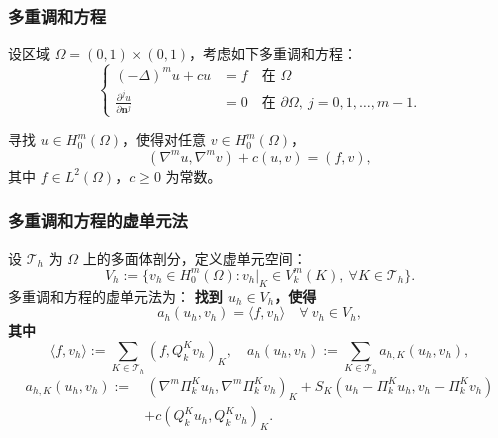 \documentclass[notheorems,serif]{beamer}
\begin{document}
\begin{frame}
\frametitle{多重调和方程}

\begin{definition}[多重调和方程]
  设区域 $\Omega = (0, 1)\times(0, 1)$，考虑如下多重调和方程：
  $$
  \left\{
  \begin{aligned}
      (-\Delta)^m u + c u & = f \quad \text{在 } \Omega\\
      \frac{\partial^j u}{\partial \boldsymbol{n}^j} & = 0 \quad \text{在 } \partial\Omega,~
      j = 0, 1, \dots, m-1.
  \end{aligned}
  \right.
  $$
\end{definition}

\begin{definition}[变分形式]
  寻找 $u \in H_0^m(\Omega)$，使得对任意 $v \in H_0^m(\Omega)$，
  $$
  (\nabla^m u, \nabla^m v) + c(u, v) = (f, v),
  $$
  其中 $f \in L^2(\Omega)$，$c \geq 0$ 为常数。
\end{definition}
\end{frame}

\begin{frame}
\frametitle{多重调和方程的虚单元法}

\begin{definition}
  设 $\mathcal{T}_h$ 为 $\Omega$ 上的多面体剖分，定义虚单元空间：
  $$
  V_h := \{v_h \in H_0^m(\Omega): v_h|_K \in V_k^m(K), ~\forall K \in \mathcal{T}_h\}.
  $$
  多重调和方程的虚单元法为：
  {\bf 找到 $u_h \in V_h$，使得}
  $$
  a_h(u_h, v_h) = \langle f, v_h \rangle \quad \forall~v_h \in V_h,
  $$
  {\bf 其中}
  $$
  \langle f, v_h \rangle := \sum_{K \in \mathcal{T}_h}(f, Q_k^K v_h)_K, \quad
  a_h(u_h, v_h) := \sum_{K \in \mathcal{T}_h} a_{h,K}(u_h, v_h),
  $$
  $$
  \begin{aligned}
  a_{h,K}(u_h, v_h) :=&\, (\nabla^m \Pi_k^K u_h, \nabla^m \Pi_k^K v_h)_K
  + S_K(u_h - \Pi_k^K u_h, v_h - \Pi_k^K v_h) \\
  &+ c(Q_k^K u_h, Q_k^K v_h)_K.
  \end{aligned}
  $$
\end{definition}

\end{frame}
\end{document}
